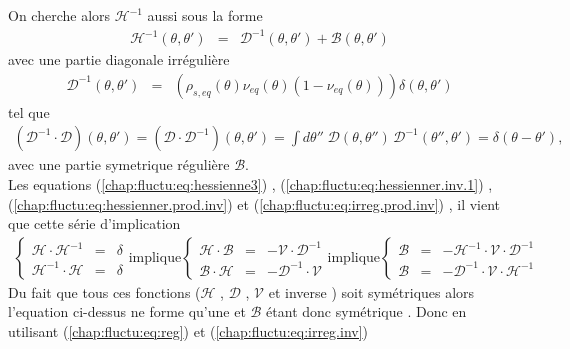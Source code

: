  On cherche alors \( \mathcal{H}^{-1} \) aussi sous la forme 
\begin{eqnarray}
	\mathcal{H}^{-1}(\theta, \theta') & = & \mathcal{D}^{-1}(\theta, \theta') + \mathcal{B}(\theta, \theta') 
	\label{chap:fluctu:eq:hessienner.inv.1}	
\end{eqnarray}
avec une partie diagonale irrégulière
\begin{eqnarray}
	\mathcal{D}^{-1}(\theta, \theta') & = & (\rho_{\! s , eq}(\theta)  \nu_{\! eq}(\theta)(1 -\nu_{\! eq}(\theta)))  \delta(\theta, \theta') 
	 \label{chap:fluctu:eq:irreg.inv}	
\end{eqnarray}
tel que 
\begin{eqnarray}
    (\mathcal{D}^{-1} \cdot  \mathcal{D})(\theta, \theta')  = (\mathcal{D}\cdot  \mathcal{D}^{-1})(\theta, \theta') =  \int d\theta'' \; \mathcal{D}(\theta, \theta'') \, \mathcal{D}^{-1}(\theta'', \theta') = \delta(\theta - \theta'),
    \label{chap:fluctu:eq:irreg.prod.inv}
\end{eqnarray}
avec une partie symetrique régulière $\mathcal{B}$.\\
Les equations (\ref{chap:fluctu:eq:hessienne3}) , (\ref{chap:fluctu:eq:hessienner.inv.1}) , (\ref{chap:fluctu:eq:hessienner.prod.inv}) et (\ref{chap:fluctu:eq:irreg.prod.inv}) , il vient que cette série d'implication
\begin{eqnarray*}
	\left \{\begin{array}{rcl} \mathcal{H}\cdot\mathcal{H}^{-1} & =& \delta \\  \mathcal{H}^{-1}\cdot\mathcal{H} & =& \delta  \end{array} \right.  \mbox{implique}	 \left \{\begin{array}{rcl} \mathcal{H}\cdot\mathcal{B} & =& - \mathcal{V}\cdot\mathcal{D}^{-1} \\  \mathcal{B}\cdot\mathcal{H} & =& - \mathcal{D}^{-1}\cdot\mathcal{V}  \end{array} \right. \mbox{implique} \left \{\begin{array}{rcl} \mathcal{B} & =& - \mathcal{H}^{-1}\cdot\mathcal{V}\cdot \mathcal{D}^{-1}  \\  \mathcal{B} & =& - \mathcal{D}^{-1}\cdot\mathcal{V}\cdot \mathcal{H}^{-1}  \end{array} \right.	
\end{eqnarray*}
Du fait que tous ces fonctions ($\mathcal{H}$ , $\mathcal{D}$ , $\mathcal{V}$ et inverse ) soit symétriques alors l'equation ci-dessus ne forme qu'une et $\mathcal{B}$ étant donc symétrique .
Donc en utilisant (\ref{chap:fluctu:eq:reg}) et (\ref{chap:fluctu:eq:irreg.inv}) 

